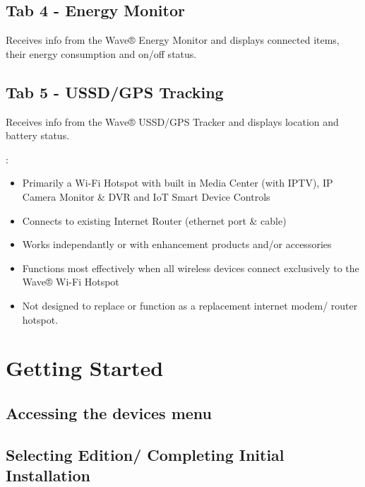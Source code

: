 \documentclass[letterpaper,10pt,openany,oneside,english]{sphinxmanual}
\begin{document}
\subsection{Tab 4 - Energy Monitor}
\label{\detokenize{introduction:tab-4-energy-monitor}}
Receives info from the Wave® Energy Monitor and displays connected items, their energy consumption and on/off status.


\subsection{Tab 5 - USSD/GPS Tracking}
\label{\detokenize{introduction:tab-5-ussd-gps-tracking}}
Receives info from the  Wave® USSD/GPS Tracker and displays location and battery status.

:
\begin{itemize}
\item {} 
Primarily a Wi-Fi Hotspot with built in Media Center (with IPTV), IP Camera Monitor \& DVR and IoT Smart Device Controls

\item {} 
Connects to existing Internet Router (ethernet port \& cable)

\item {} 
Works independantly or with enhancement products and/or accessories

\item {} 
Functions most effectively when all wireless devices connect exclusively to the Wave® Wi-Fi Hotspot

\item {} 
Not designed to replace or function as a replacement internet modem/ router hotspot.

\end{itemize}


\section{Getting Started}
\label{\detokenize{introduction:getting-started}}

\subsection{Accessing the devices menu}
\label{\detokenize{introduction:accessing-the-devices-menu}}

\subsection{Selecting Edition/ Completing Initial Installation}
\label{\detokenize{introduction:selecting-edition-completing-initial-installation}}
\end{document}
